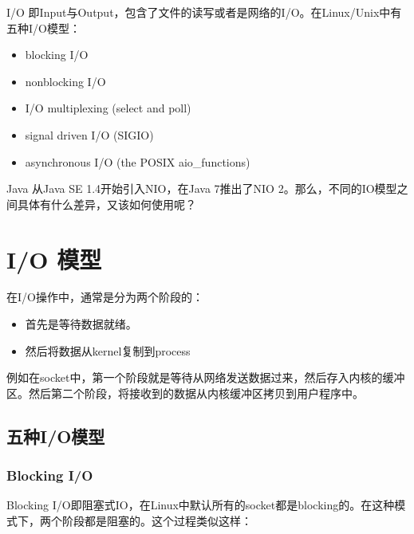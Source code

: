 \documentclass[12pt]{article}
\begin{document}
\makeblogtitle

I/O 即Input与Output，包含了文件的读写或者是网络的I/O。在Linux/Unix中有五种I/O模型：

\begin{itemize}
\tightlist
\item
  blocking I/O
\item
  nonblocking I/O
\item
  I/O multiplexing (select and poll)
\item
  signal driven I/O (SIGIO)
\item
  asynchronous I/O (the POSIX aio\_functions)
\end{itemize}

Java 从Java SE 1.4开始引入NIO，在Java 7推出了NIO 2。那么，不同的IO模型之间具体有什么差异，又该如何使用呢？

\section{I/O 模型}\label{io-ux6a21ux578b}

在I/O操作中，通常是分为两个阶段的：

\begin{itemize}
\tightlist
\item
  首先是等待数据就绪。
\item
  然后将数据从kernel复制到process
\end{itemize}

例如在socket中，第一个阶段就是等待从网络发送数据过来，然后存入内核的缓冲区。然后第二个阶段，将接收到的数据从内核缓冲区拷贝到用户程序中。

\subsection{五种I/O模型}\label{ux4e94ux79cdioux6a21ux578b}

\subsubsection{Blocking I/O}\label{blocking-io}

Blocking I/O即阻塞式IO，在Linux中默认所有的socket都是blocking的。在这种模式下，两个阶段都是阻塞的。这个过程类似这样：

\begin{Shaded}
\begin{Highlighting}[]
\OperatorTok{=}\OperatorTok{(}\OperatorTok{)}
\end{Highlighting}
\end{Shaded}
\end{document}

